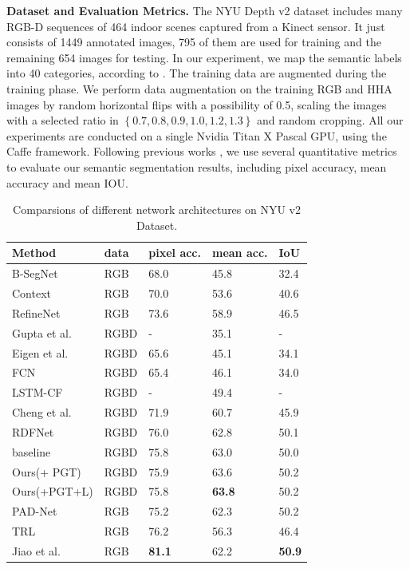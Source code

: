 {\bf{Dataset and Evaluation Metrics.}} 
The NYU Depth v2 dataset includes many RGB-D sequences of 464 indoor scenes captured from a Kinect sensor. 
%
It just consists of 1449 annotated images, 795 of them are used for training and the remaining 654 images for testing.
%
In our experiment, we map the semantic labels into 40 categories, according to \cite{Gupta2014}.
%
The training data are augmented during the training phase. 
%
We perform data augmentation on the training RGB and HHA images by random horizontal flips with a possibility of 0.5, scaling the images with a selected ratio in $\left\{0.7,0.8,0.9,1.0,1.2,1.3\right\}$ and random cropping. 
%
All our experiments are conducted on a single Nvidia Titan X Pascal GPU, using the Caffe framework.
%
Following previous works
\cite{Eigen2015,Gupta2014,Kendall2015,Lin2016,Lin2017,Li2016,Cheng2017,Park2017,Xu2018,Zhang2018,Jiao2018}, we use several quantitative metrics to evaluate our semantic segmentation results, including pixel 
accuracy, mean accuracy and mean IOU. 
%
\begin{table}[!htbp]
	\vspace{-0.4cm}
	\centering
	\caption{Comparsions of different network architectures on NYU v2 Dataset.}
	\begin{tabular*}{8.7cm}{lllll}
		\hline
		Method & data & pixel acc. & mean acc. & IoU\\
		\hline \hline
		B-SegNet \cite{Kendall2015} & RGB &68.0 & 45.8 & 32.4 \\
		Context \cite{Lin2016} & RGB & 70.0 & 53.6 & 40.6 \\
		RefineNet \cite{Lin2017} & RGB & 73.6 & 58.9 & 46.5\\
		\hline
		Gupta et al. \cite{Gupta2014} & RGBD & - & 35.1 &-\\
		Eigen et al. \cite{Eigen2015} & RGBD & 65.6 & 45.1 & 34.1\\
		FCN \cite{Long2015} & RGBD & 65.4 & 46.1 & 34.0 \\
		LSTM-CF \cite{Li2016} & RGBD & - & 49.4 & - \\
		Cheng et al.\cite{Cheng2017} & RGBD & 71.9 & 60.7 & 45.9 \\
		RDFNet \cite{Park2017} & RGBD & 76.0 & 62.8 & 50.1\\	
		\hline
		baseline &RGBD & 75.8 & 63.0 & 50.0\\
		Ours(+ PGT) & RGBD & 75.9 & 63.6 & 50.2\\
		Ours(+PGT+L)& RGBD & 75.8 & \bf{63.8} & 50.2\\
		\hline
		PAD-Net \cite{Xu2018} & RGB &75.2 & 62.3 & 50.2\\
		TRL \cite{Zhang2018} & RGB &76.2 & 56.3 & 46.4\\
		Jiao et al.\cite{Jiao2018} & RGB & \bf{81.1} & 62.2 & \bf{50.9}\\
		\hline		 		
	\end{tabular*}
	\label{Tab:Results}
\end{table}
